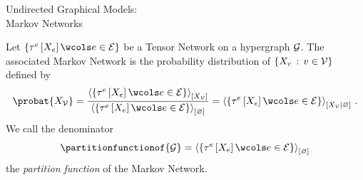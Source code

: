 \documentclass{beamer}
\begin{document}
    \begin{frame}{Undirected Graphical Models:\\
    Markov Networks}


        \begin{definition}
	Let $\{\hypercoreofat{\edge}{\catvariableof{\edge}} \wcols \edgein\}$ be a Tensor Network on a hypergraph $\mathcal{G}$.
    The associated Markov Network is the probability distribution of $\{X_{v}\,:\,v\in\mathcal{V}\}$ defined by
    \[ \probat{\nodevariables} = \frac{
        \contractionof{\{\hypercoreofat{\edge}{\catvariableof{\edge}} \wcols \edgein\}}{\nodevariables}
    }{
        \contractionof{\{\hypercoreofat{\edge}{\catvariableof{\edge}} \wcols \edgein\}}{\varnothing}
    } = \normalizationofwrt{\{\hypercoreofat{\edge}{\catvariableof{\edge}} \wcols \edgein\}}{\nodevariables}{\varnothing} \, . \]
    We call the denominator
    \[\partitionfunctionof{\graph} = \contractionof{\{\hypercoreofat{\edge}{\catvariableof{\edge}} \wcols \edgein\}}{\varnothing} \]
    the \emph{partition function} of the Markov Network.
        \end{definition}

    \end{frame}
\end{document}
